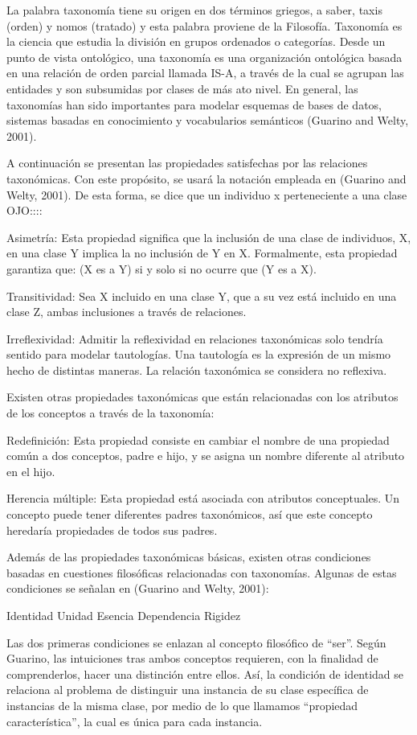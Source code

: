 La palabra taxonomía tiene su origen en dos términos griegos, a saber, taxis (orden) y nomos (tratado) y esta palabra proviene de la Filosofía. Taxonomía es la ciencia que estudia la división en grupos ordenados o categorías. Desde un punto de vista ontológico, una taxonomía es una organización ontológica basada en una relación de orden parcial llamada IS-A, a través de la cual se agrupan las entidades y son subsumidas por clases de más ato nivel. En general, las taxonomías han sido importantes para modelar esquemas de bases de datos, sistemas basadas en
conocimiento y vocabularios semánticos (Guarino and Welty, 2001).

A continuación se presentan las propiedades satisfechas por las relaciones taxonómicas. Con este propósito, se usará la notación empleada en (Guarino and Welty, 2001). De esta forma, se dice que un individuo x perteneciente a una clase OJO::::

Asimetría: Esta propiedad significa que la inclusión de una clase de individuos, X, en una clase Y implica la no inclusión de Y en X. Formalmente, esta propiedad garantiza que: (X es a Y) si y solo si no ocurre que (Y es a X).

Transitividad: Sea X incluido en una clase Y, que a su vez está incluido en una clase Z, ambas inclusiones a través de relaciones.

Irreflexividad: Admitir la reflexividad en relaciones taxonómicas solo tendría sentido para modelar tautologías. Una tautología es la expresión de un mismo hecho de distintas maneras. La relación taxonómica se considera no reflexiva.

Existen otras propiedades taxonómicas que están relacionadas con los atributos de los conceptos a través de la taxonomía:

Redefinición: Esta propiedad consiste en cambiar el nombre de una propiedad común a dos conceptos, padre e hijo, y se asigna un nombre diferente al atributo en el hijo. 

Herencia múltiple: Esta propiedad está asociada con atributos conceptuales. Un concepto puede tener diferentes padres taxonómicos, así que este concepto heredaría propiedades de todos sus padres. 

Además de las propiedades taxonómicas básicas, existen otras condiciones basadas en cuestiones filosóficas relacionadas con taxonomías. Algunas de estas condiciones se señalan en (Guarino and Welty, 2001):

Identidad
Unidad
Esencia
Dependencia
Rigidez

Las dos primeras condiciones se enlazan al concepto filosófico de “ser”. Según Guarino, las intuiciones tras ambos conceptos requieren, con la finalidad de comprenderlos, hacer una distinción entre ellos. Así, la condición de identidad se relaciona al problema de distinguir una instancia de su clase específica de instancias de la misma clase, por medio de lo que llamamos “propiedad característica”, la cual es única para cada instancia.

